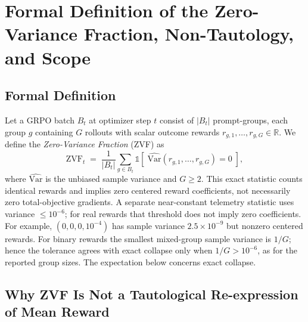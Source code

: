 \section{Formal Definition of the Zero-Variance Fraction, Non-Tautology, and Scope}
\label{sec:appendix:zvf-formalization}

\subsection{Formal Definition}

Let a GRPO batch $B_t$ at optimizer step $t$ consist of $|B_t|$ prompt-groups,
each group $g$ containing $G$ rollouts with scalar outcome rewards
$r_{g,1}, \ldots, r_{g,G} \in \mathbb{R}$. We define the \emph{Zero-Variance
Fraction} (ZVF) as
\begin{equation}
\label{eq:zvf}
\mathrm{ZVF}_t \;=\; \frac{1}{|B_t|} \sum_{g \in B_t}
  \mathbb{1}\!\left[\;\widehat{\mathrm{Var}}(r_{g,1}, \ldots, r_{g,G}) = 0\;\right],
\end{equation}
where $\widehat{\mathrm{Var}}$ is the unbiased sample variance and $G\ge2$.
This exact statistic counts identical rewards and implies zero centered
reward coefficients, not necessarily zero total-objective gradients.
A separate near-constant telemetry statistic uses variance $\le10^{-6}$;
for real rewards that threshold does not imply zero coefficients. For example,
$(0,0,0,10^{-4})$ has sample variance $2.5\times10^{-9}$ but nonzero centered
rewards. For binary rewards the smallest mixed-group sample variance is
$1/G$; hence the tolerance agrees with exact collapse only when $1/G>10^{-6}$,
as for the reported group sizes. The expectation below concerns exact collapse.

\subsection{Why ZVF Is Not a Tautological Re-expression of Mean Reward}

